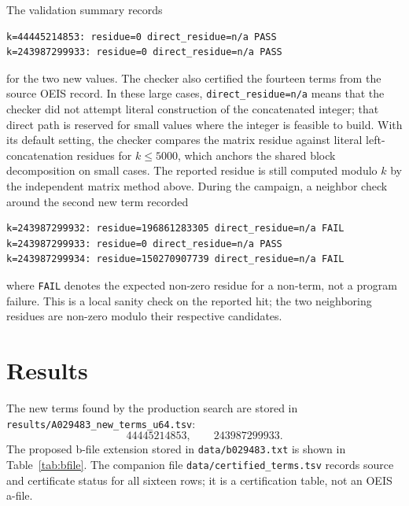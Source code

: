 \documentclass[11pt]{article}
\theoremstyle{definition}
\theoremstyle{remark}
\begin{document}
The validation summary records
\begin{verbatim}
k=44445214853: residue=0 direct_residue=n/a PASS
k=243987299933: residue=0 direct_residue=n/a PASS
\end{verbatim}
for the two new values.  The checker also certified the fourteen terms from
the source OEIS record.  In these large cases, \texttt{direct\_residue=n/a}
means that the checker did not attempt literal construction of the
concatenated integer; that direct path is reserved for small values where the
integer is feasible to build.  With its default setting, the checker compares
the matrix residue against literal left-concatenation residues for
\(k\le 5000\), which anchors the shared block decomposition on small cases.
The reported residue is still computed modulo \(k\) by the independent matrix
method above.  During the campaign, a
neighbor check around the second new term recorded
\begin{verbatim}
k=243987299932: residue=196861283305 direct_residue=n/a FAIL
k=243987299933: residue=0 direct_residue=n/a PASS
k=243987299934: residue=150270907739 direct_residue=n/a FAIL
\end{verbatim}
where \texttt{FAIL} denotes the expected non-zero residue for a non-term, not
a program failure.  This is a local sanity check on the reported hit; the two
neighboring residues are non-zero modulo their respective candidates.

\section{Results}
\label{sec:results}

The new terms found by the production search are stored in
\texttt{results/A029483\_new\_terms\_u64.tsv}:
\[
  44445214853,\qquad 243987299933.
\]
The proposed b-file extension stored in \texttt{data/b029483.txt} is shown in
Table~\ref{tab:bfile}.  The companion file
\texttt{data/certified\_terms.tsv} records source and certificate status for
all sixteen rows; it is a certification table, not an OEIS a-file.
\end{document}
